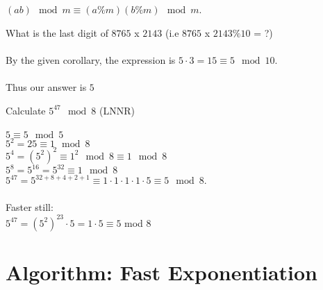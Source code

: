\begin{corollary}
$(ab) \mod{m} \equiv (a \% m)(b \% m) \mod{m}$. 
\end{corollary}

\begin{example}
What is the last digit of $8765$ x $2143$ (i.e $8765$ x $2143 \% 10$ = ?)\\
\\
By the given corollary, the expression is $5 \cdot 3 = 15 \equiv 5 \mod{10}$.\\
\\Thus our answer is $5$
\\
\end{example}

\begin{example}
Calculate $5^{47} \mod{8}$ (LNNR)\\
\\$5 \equiv 5 \mod{5}$
\\$5^2 = 25 \equiv 1 \mod{8}$
\\$5^4 = (5^2)^2 \equiv 1^2 \mod{8} \equiv 1 \mod{8}$
\\$5^8 = 5^{16} = 5^{32} \equiv 1 \mod{8}$
\\$5^{47} = 5^{32 + 8 + 4 + 2 + 1} \equiv 1 \cdot 1 \cdot 1 \cdot 1 \cdot 5 \equiv 5 \mod{8}$.
\\
\\ Faster still:\\
$5^{47} = (5^2)^{23} \cdot 5 = 1 \cdot 5 \equiv 5$ mod $8$
\end{example}

\section{Algorithm: Fast Exponentiation}

